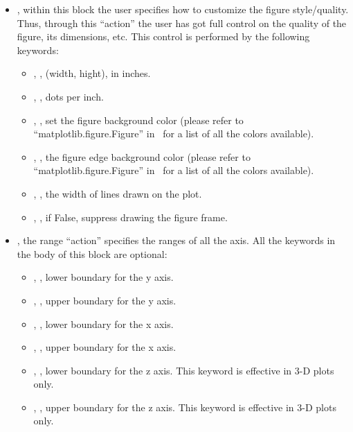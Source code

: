\begin{itemize}
  \item {}, within this block the user specifies how
  to customize the figure style/quality.
  Thus, through this ``action'' the user has got full control on the quality of
  the figure, its dimensions, etc.
  This control is performed by the following keywords:
  \begin{itemize}
    \item {}, , (width, hight), in
    inches.
    \item {}, , dots per inch.
    \item {}, , set the figure background color
    (please refer to ``matplotlib.figure.Figure'' in~\cite{MatPlotLib} for a
    list of all the colors available).
    \item {}, , the figure edge background
    color (please refer to ``matplotlib.figure.Figure'' in~\cite{MatPlotLib} for
    a list of all the colors available).
    \item {}, , the width of lines drawn on the
    plot.
    \item {}, , if False, suppress drawing the
    figure frame.
  \end{itemize}
  \item {}, the range ``action'' specifies the ranges of all the
  axis.
  All the keywords in the body of this block are optional:
  \begin{itemize}
    \item {}, , lower boundary for the 
    y axis.
    \item {}, , upper boundary for the 
    y axis.
    \item {}, , lower boundary for the
    x axis.
    \item {}, , upper boundary for the
    x axis.
    \item {}, , lower boundary for the
    z axis.
    \nb This keyword is effective in 3-D plots only.
    \item {}, , upper boundary for the
    z axis.
    \nb This keyword is effective in 3-D plots only.
  \end{itemize}

\end{itemize}
